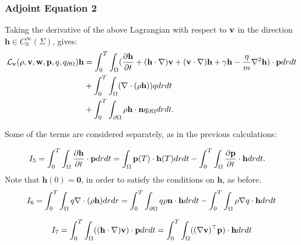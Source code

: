 \subsubsection{Adjoint Equation 2}

Taking the derivative of the above Lagrangian with respect to $\mathbf{v}$ in the direction $\mathbf{h} \in C_0^\infty(\Sigma)$, gives:
\begin{align*}
\mathcal{L}_{\mathbf{v}}(\rho,\mathbf{v},\mathbf{w},\mathbf{p},q,{q}_{\partial \Omega})\mathbf{h} &=  \int_0^T \int_\Omega ( \frac{\partial \mathbf{h} }{\partial t} +  (\mathbf{h} \cdot \nabla)\mathbf{v} +  (\mathbf{v} \cdot \nabla)\mathbf{h} +  \gamma \mathbf{h} - \frac{\eta}{m}\nabla^2 \mathbf{h}) \cdot \mathbf{p} dr dt\\
& + \int_0^T \int_\Omega ( \nabla \cdot (\rho \mathbf{h})) q dr dt\\ 
& +\int_0^T \int_{\partial\Omega} \rho \mathbf{h} \cdot \mathbf{n} {q}_{\partial \Omega} dr dt.
\end{align*}

Some of the terms are considered separately, as in the previous calculations:

\begin{align*}
I_5 &= \int_0^T \int_\Omega  \frac{\partial \mathbf{h} }{\partial t} \cdot \mathbf{p} dr dt = \int_\Omega \mathbf{p}(T) \cdot \mathbf{h}(T) dr dt  - \int_0^T \int_\Omega \frac{\partial \mathbf{p}}{\partial t} \cdot \mathbf{h} dr dt.
\end{align*}
Note that $\mathbf{h}(0)=\mathbf{0}$, in order to satisfy the conditions on $\mathbf{h}$, as before.
\begin{align*}
I_6= \int_0^T \int_\Omega q\nabla \cdot ( \rho \mathbf{h}) dr dr = \int_0^T \int_{\partial \Omega} q \rho  \mathbf{n}\cdot \mathbf{h} dr dt - \int_0^T \int_\Omega \rho\nabla q \cdot  \mathbf{h} dr dt
\end{align*}

\begin{align*}
I_7 = \int_0^T \int_\Omega  ((\mathbf{h} \cdot \nabla)\mathbf{v} ) \cdot\mathbf{p} dr dt = \int_0^T \int_\Omega  ((\nabla \mathbf{v})^\top\mathbf{p}) \cdot  \mathbf{h} dr dt
\end{align*}


